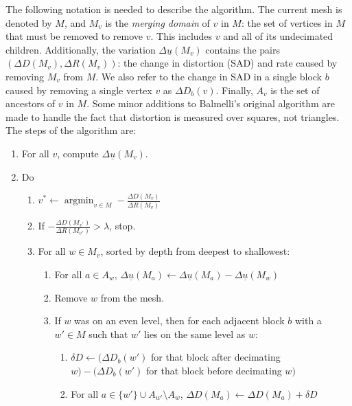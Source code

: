 \documentclass[11pt,letterpaper]{article}
\DeclareMathOperator*{\argmin}{argmin}
\begin{document}
The following notation is needed to describe the algorithm.
The current mesh is denoted by $M$, and $M_v$ is the \textit{merging domain} of
 $v$ in $M$: the set of vertices in $M$ that must be removed to remove $v$.
This includes $v$ and all of its undecimated children.
Additionally, the variation $\Delta\underline{u}(M_v)$ contains the pairs
 $(\Delta D(M_v),\Delta R(M_v))$: the change in distortion (SAD) and rate
 caused by removing $M_v$ from $M$.
We also refer to the change in SAD in a single block $b$ caused by removing a
 single vertex $v$ as $\Delta D_b(v)$.
Finally, $A_v$ is the set of ancestors of $v$ in $M$.
Some minor additions to Balmelli's original algorithm are made to handle the
 fact that distortion is measured over squares, not triangles.
The steps of the algorithm are:
\begin{enumerate}
\item For all $v$, compute $\Delta\underline{u}(M_v)$.
\item Do
\begin{enumerate}
\item $v^*\leftarrow\argmin_{v\in M} -\frac{\Delta D(M_v)}{\Delta R(M_v)}$
\item If $-\frac{\Delta D(M_{v^*})}{\Delta R(M_{v^*})}>\lambda$, stop.
\item For all $w\in M_v$, sorted by depth from deepest to shallowest:
\begin{enumerate}
\item For all $a\in A_w$, $\Delta\underline{u}(M_a)\leftarrow
 \Delta\underline{u}(M_a)-\Delta\underline{u}(M_w)$
\item Remove $w$ from the mesh.
\item\label{step:deltad}
If $w$ was on an even level, then for each adjacent block $b$ with a $w'\in M$
 such that $w'$ lies on the same level as $w$:
\begin{enumerate}
\item $\delta D\leftarrow (\Delta D_b(w')$ for that block after decimating
 $w)-(\Delta D_b(w')$ for that block before decimating $w)$
\item\label{step:deltadupdate} For all $a\in \{w'\}\cup A_{w'}\setminus A_{w}$,
 $\Delta D(M_a)\leftarrow\Delta D(M_a)+\delta D$
\end{enumerate}
\end{enumerate}
\end{enumerate}
\end{enumerate}
\end{document}
